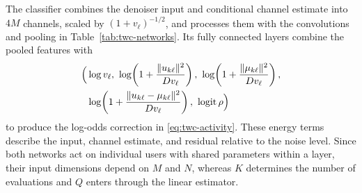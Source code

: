 The classifier combines the denoiser input and conditional channel
estimate into $4M$ channels, scaled by $(1+v_\ell)^{-1/2}$, and
processes them with the convolutions and pooling in
Table~\ref{tab:twc-networks}. Its fully connected layers combine the
pooled features with
\begin{equation}
 \begin{aligned}
 \Big(&\log v_\ell,\
 \log\!\left(1+\frac{\|u_{k\ell}\|^2}{Dv_\ell}\right),\
 \log\!\left(1+\frac{\|\mu_{k\ell}\|^2}{Dv_\ell}\right),\\
 &\log\!\left(1+\frac{\|u_{k\ell}-\mu_{k\ell}\|^2}{Dv_\ell}\right),\
 \operatorname{logit}\rho\Big)
 \end{aligned}
 \label{eq:twc-classifier-features}
\end{equation}
to produce the log-odds correction in \eqref{eq:twc-activity}.
These energy terms describe the input, channel estimate, and residual
relative to the noise level. Since both networks act on individual
users with shared parameters within a layer, their input dimensions
depend on $M$ and $N$, whereas $K$ determines the number of evaluations
and $Q$ enters through the linear estimator.

